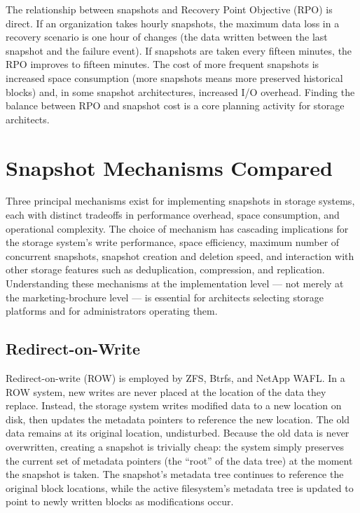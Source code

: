 The relationship between snapshots and Recovery Point Objective (RPO) is direct. If an organization takes hourly snapshots, the maximum data loss in a recovery scenario is one hour of changes (the data written between the last snapshot and the failure event). If snapshots are taken every fifteen minutes, the RPO improves to fifteen minutes. The cost of more frequent snapshots is increased space consumption (more snapshots means more preserved historical blocks) and, in some snapshot architectures, increased I/O overhead. Finding the balance between RPO and snapshot cost is a core planning activity for storage architects.

\section{Snapshot Mechanisms Compared}

Three principal mechanisms exist for implementing snapshots in storage systems, each with distinct tradeoffs in performance overhead, space consumption, and operational complexity. The choice of mechanism has cascading implications for the storage system's write performance, space efficiency, maximum number of concurrent snapshots, snapshot creation and deletion speed, and interaction with other storage features such as deduplication, compression, and replication. Understanding these mechanisms at the implementation level --- not merely at the marketing-brochure level --- is essential for architects selecting storage platforms and for administrators operating them.

\subsection{Redirect-on-Write}

Redirect-on-write (ROW) is employed by ZFS, Btrfs, and NetApp WAFL. In a ROW system, new writes are never placed at the location of the data they replace. Instead, the storage system writes modified data to a new location on disk, then updates the metadata pointers to reference the new location. The old data remains at its original location, undisturbed. Because the old data is never overwritten, creating a snapshot is trivially cheap: the system simply preserves the current set of metadata pointers (the ``root'' of the data tree) at the moment the snapshot is taken. The snapshot's metadata tree continues to reference the original block locations, while the active filesystem's metadata tree is updated to point to newly written blocks as modifications occur.

